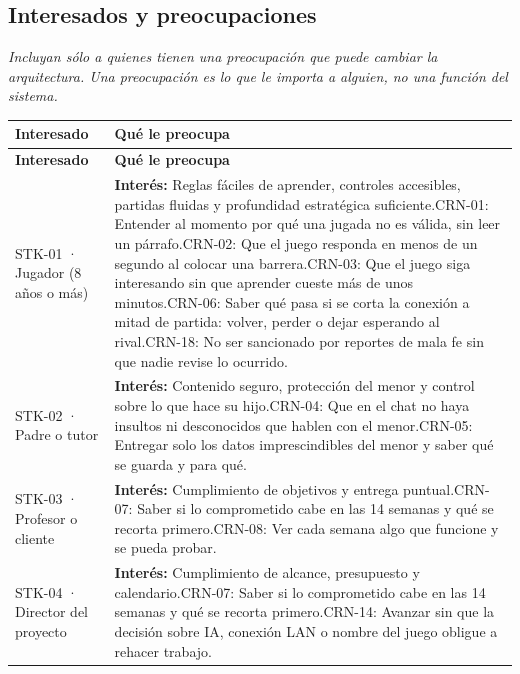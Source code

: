 \documentclass[11pt,letterpaper]{article}
\newcommand{\hint}[1]{{\itshape\color{black!70}#1}\par} %
\newcommand{\hd}[1]{\textbf{\small #1}}
\newcommand{\headrow}{\rowcolor{SADHead}}
\begin{document}
\subsection{Interesados y preocupaciones}
\hint{Incluyan sólo a quienes tienen una preocupación que puede cambiar la arquitectura. Una preocupación es lo que le importa a alguien, no una función del sistema.}
\begin{xltabular}{\linewidth}{|>{\raggedright\arraybackslash}p{4.2cm}|Y|}\hline
  \headrow\hd{Interesado} & \hd{Qué le preocupa}\\\hline
  \endfirsthead
  \headrow\hd{Interesado} & \hd{Qué le preocupa}\\\hline
  \endhead
  STK-01 · Jugador (8 años o más) & \textbf{Interés:} Reglas fáciles de aprender, controles accesibles, partidas fluidas y profundidad estratégica suficiente.\newline CRN-01: Entender al momento por qué una jugada no es válida, sin leer un párrafo.\newline CRN-02: Que el juego responda en menos de un segundo al colocar una barrera.\newline CRN-03: Que el juego siga interesando sin que aprender cueste más de unos minutos.\newline CRN-06: Saber qué pasa si se corta la conexión a mitad de partida: volver, perder o dejar esperando al rival.\newline CRN-18: No ser sancionado por reportes de mala fe sin que nadie revise lo ocurrido.\\\hline
  STK-02 · Padre o tutor & \textbf{Interés:} Contenido seguro, protección del menor y control sobre lo que hace su hijo.\newline CRN-04: Que en el chat no haya insultos ni desconocidos que hablen con el menor.\newline CRN-05: Entregar solo los datos imprescindibles del menor y saber qué se guarda y para qué.\\\hline
  STK-03 · Profesor o cliente & \textbf{Interés:} Cumplimiento de objetivos y entrega puntual.\newline CRN-07: Saber si lo comprometido cabe en las 14 semanas y qué se recorta primero.\newline CRN-08: Ver cada semana algo que funcione y se pueda probar.\\\hline
  STK-04 · Director del proyecto & \textbf{Interés:} Cumplimiento de alcance, presupuesto y calendario.\newline CRN-07: Saber si lo comprometido cabe en las 14 semanas y qué se recorta primero.\newline CRN-14: Avanzar sin que la decisión sobre IA, conexión LAN o nombre del juego obligue a rehacer trabajo.\\\hline

\end{xltabular}
\end{document}
